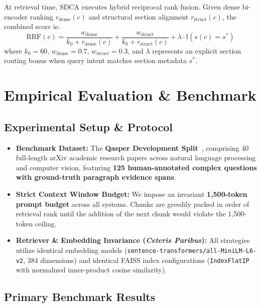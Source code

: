 \documentclass[conference]{IEEEtran}
\begin{document}
At retrieval time, SDCA executes hybrid reciprocal rank fusion. Given dense bi-encoder ranking $r_{\text{dense}}(c)$ and structural section alignment $r_{\text{struct}}(c)$, the combined score is:
\begin{equation}
\text{RRF}(c) = \frac{w_{\text{dense}}}{k_0 + r_{\text{dense}}(c)} + \frac{w_{\text{struct}}}{k_0 + r_{\text{struct}}(c)} + \lambda \cdot \mathbb{I}(s(c) = s^*)
\end{equation}
where $k_0 = 60$, $w_{\text{dense}} = 0.7$, $w_{\text{struct}} = 0.3$, and $\lambda$ represents an explicit section routing bonus when query intent matches section metadata $s^*$.

\section{Empirical Evaluation \& Benchmark}

\subsection{Experimental Setup \& Protocol}
\begin{itemize}
    \item \textbf{Benchmark Dataset:} The \textbf{Qasper Development Split}~\cite{dasigi2021qasper}, comprising 40 full-length arXiv academic research papers across natural language processing and computer vision, featuring \textbf{125 human-annotated complex questions with ground-truth paragraph evidence spans}.
    \item \textbf{Strict Context Window Budget:} We impose an invariant \textbf{1,500-token prompt budget} across all systems. Chunks are greedily packed in order of retrieval rank until the addition of the next chunk would violate the 1,500-token ceiling.
    \item \textbf{Retriever \& Embedding Invariance (\textit{Ceteris Paribus}):} All strategies utilize identical embedding models (\texttt{sentence-transformers/all-MiniLM-L6-v2}, 384 dimensions) and identical FAISS index configurations (\texttt{IndexFlatIP} with normalized inner-product cosine similarity).
\end{itemize}

\subsection{Primary Benchmark Results}
\end{document}
